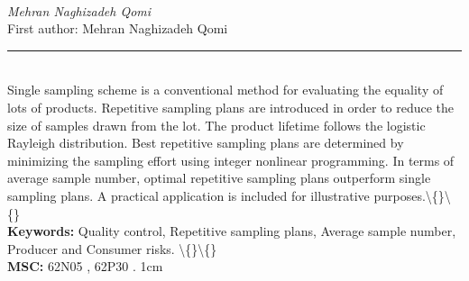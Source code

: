 \documentclass[10pt,twoside]{article}
\begin{document}
\noindent\begin{minipage}[t][\textheight]{\textwidth}
\\[0.35em]
{\itshape Mehran Naghizadeh Qomi}\\[0.2em]
{\footnotesize First author: Mehran Naghizadeh Qomi}\\[0.45em]
\noindent\rule{\textwidth}{0.3pt}\\[0.4em]
{\footnotesize  Single sampling scheme is a conventional method for evaluating the equality of lots of products. Repetitive sampling plans are introduced in order to reduce the size of samples drawn from the lot. The product lifetime follows the logistic Rayleigh distribution. Best repetitive sampling plans are determined by minimizing the sampling effort using integer nonlinear programming. In terms of average sample number, optimal repetitive sampling plans outperform single sampling plans. A practical application is included for illustrative purposes.\textbackslash\{\}\textbackslash\{\}}\\[0.4em]
{\footnotesize\bfseries Keywords:} {\footnotesize Quality control, Repetitive sampling plans, Average sample number, Producer and Consumer risks. \textbackslash\{\}\textbackslash\{\}}\\[0.15em]
{\footnotesize\bfseries MSC:} {\footnotesize 62N05 , 62P30 . 1cm}\\
\vfill
\end{minipage}
\newpage
\end{document}
